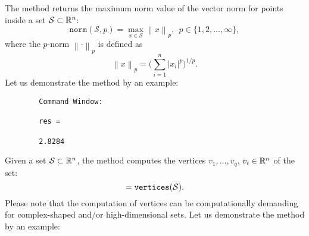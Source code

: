 The method  returns the maximum norm value of the vector norm for points inside a set $\mathcal{S} \subset \mathbb{R}^n$: 
$$ \texttt{norm}(\mathcal{S},p) = \max_{x \in \mathcal{S}} \left\lVert x\right\rVert_p, ~~ p \in \{1,2,\dots,\infty\},$$
where the $p$-norm $\left\lVert \cdot \right\rVert_p$ is defined as
$$ \left\lVert x\right\rVert_p = \bigg(\sum_{i=1}^n \left| x_i \right|^p \bigg)^{1/p}.$$
Let us demonstrate the method  by an example:

\begin{center}
	\begin{minipage}[t]{0.4\textwidth}
		\vspace{10pt}
		\footnotesize
		
	\end{minipage}
	\begin{minipage}[t]{0.20\textwidth}
		\vspace{10pt}
		
		\begin{verbatim}
		Command Window:
		
		res =
		
		2.8284
		\end{verbatim}
	\end{minipage}
	\begin{minipage}[t]{0.3\textwidth}
		\vspace{0pt}
		\centering
	\end{minipage}
\end{center}


Given a set $\mathcal{S} \subset \mathbb{R}^n$, the method  computes the vertices $v_1,\dots,v_q$, $v_i \in \mathbb{R}^n$ of the set:
\begin{equation*}
	[v_1,\dots,v_q] = \operator{vertices}(\mathcal{S}).
\end{equation*}
Please note that the computation of vertices can be computationally demanding for complex-shaped and/or high-dimensional sets.
Let us demonstrate the method  by an example:

